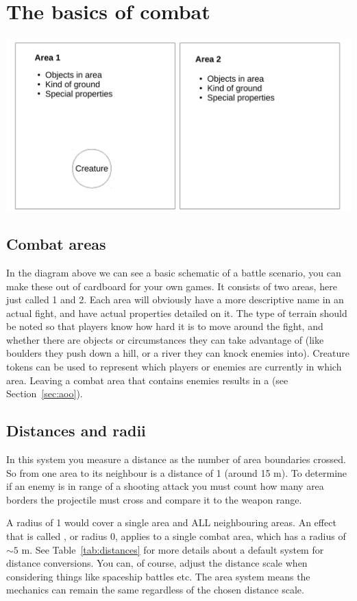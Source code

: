 \documentclass[a4paper,10pt,oneside]{book}
\newcommand{\textlf}[1]{\textbf{\titlecap{#1}}}
\newcommand{\textlfirst}[1]{\textbf{\textit{\titlecap{#1}}}}
\begin{document}
\section{The basics of combat}

\includegraphics[scale=0.5]{combat0}

\subsection{Combat areas}
In the diagram above we can see a basic schematic of a battle scenario, you can make these out of cardboard for your own games. It consists of two areas, here just called 1 and 2. Each area will obviously have a more descriptive name in an actual fight, and have actual properties detailed on it. The type of terrain should be noted so that players know how hard it is to move around the fight, and whether there are objects or circumstances they can take advantage of (like boulders they push down a hill, or a river they can knock enemies into). Creature tokens can be used to represent which players or enemies are currently in which area. Leaving a combat area that contains enemies results in a \textlf{Moment of weakness} (see Section~\ref{sec:aoo}).

\subsection{Distances and radii}
In this system you measure a distance as the number of area boundaries crossed. So from one area to its neighbour is a distance of 1 (around 15 m). To determine if an enemy is in range of a shooting attack you must count how many area borders the projectile must cross and compare it to the weapon range. 

A radius of 1 would cover a single area and ALL neighbouring areas. An effect that is called \textlfirst{adjacent}, or radius 0, applies to a single combat area, which has a radius of $\sim 5$ m. See Table~\ref{tab:distances} for more details about a default system for distance conversions. You can, of course, adjust the distance scale when considering things like spaceship battles etc. The area system means the mechanics can remain the same regardless of the chosen distance scale. 
\end{document}

